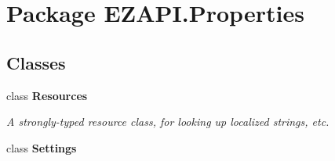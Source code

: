 \hypertarget{namespace_e_z_a_p_i_1_1_properties}{\section{Package E\-Z\-A\-P\-I.\-Properties}
\label{namespace_e_z_a_p_i_1_1_properties}
}
\subsection*{Classes}
\begin{DoxyCompactItemize}
\item 
class {\bfseries Resources}
\begin{DoxyCompactList}\small\item\em A strongly-\/typed resource class, for looking up localized strings, etc. \end{DoxyCompactList}\item 
class {\bfseries Settings}
\end{DoxyCompactItemize}
